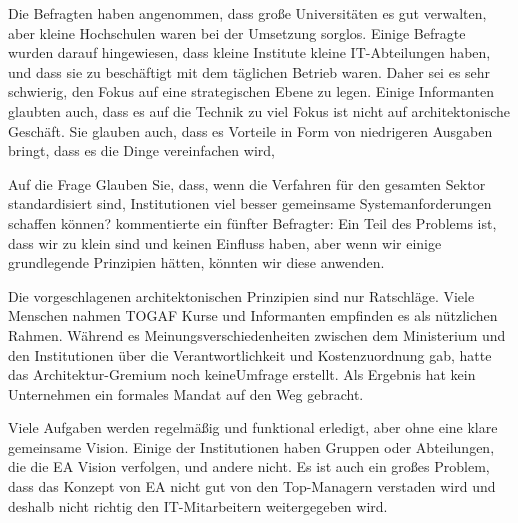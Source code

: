\documentclass[
	doc,
	a4paper,
	helv
	]{apa6}
\begin{document}
Die Befragten haben angenommen, dass große Universitäten es gut verwalten, aber  kleine Hochschulen waren bei der Umsetzung sorglos. Einige Befragte wurden darauf hingewiesen, dass kleine Institute kleine IT-Abteilungen haben, und dass sie zu beschäftigt mit dem täglichen Betrieb waren. Daher sei es sehr schwierig, den Fokus auf eine strategischen Ebene zu legen. Einige Informanten glaubten auch, dass es auf die Technik zu viel Fokus ist nicht auf architektonische Geschäft. Sie glauben auch, dass es Vorteile in Form von niedrigeren Ausgaben bringt, dass es die Dinge vereinfachen wird,

Auf die Frage \glqq Glauben Sie, dass, wenn die Verfahren für den gesamten Sektor standardisiert sind, Institutionen viel besser gemeinsame Systemanforderungen schaffen können?\grqq 
kommentierte ein fünfter Befragter:
\glqq Ein Teil des Problems ist, dass wir zu klein sind und keinen Einfluss haben, aber wenn wir einige grundlegende Prinzipien hätten, könnten wir diese anwenden.\grqq

Die vorgeschlagenen architektonischen Prinzipien sind nur  Ratschläge. Viele Menschen nahmen TOGAF Kurse und Informanten empfinden es als nützlichen Rahmen. Während es Meinungsverschiedenheiten zwischen dem Ministerium und den Institutionen über die Verantwortlichkeit und Kostenzuordnung gab, hatte das Architektur-Gremium noch keineUmfrage erstellt. Als Ergebnis hat kein Unternehmen ein formales Mandat auf den Weg gebracht.

Viele Aufgaben werden regelmäßig und funktional erledigt, aber ohne eine klare gemeinsame Vision. Einige der Institutionen haben Gruppen oder Abteilungen, die die EA Vision verfolgen, und andere nicht. Es ist auch ein großes Problem, dass das Konzept von EA nicht gut von den Top-Managern verstaden wird und deshalb nicht richtig den IT-Mitarbeitern weitergegeben wird. 
\end{document}

